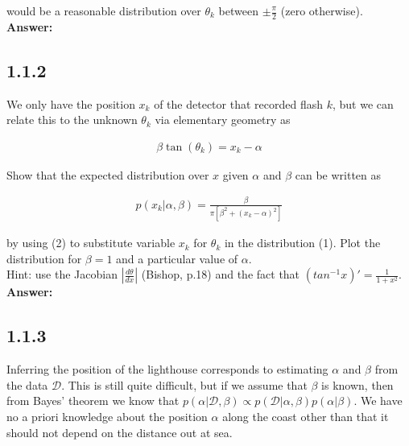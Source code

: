 \documentclass[a4paper]{article}
\begin{document}
would be a reasonable distribution over $\theta_k$ between $\pm \frac{\pi}{2}$ (zero otherwise).\\


\textbf{Answer:}\\



\subsection*{1.1.2}

We only have the position $x_k$ of the detector that recorded flash $k$, but we can relate this to the unknown $\theta_k$ via elementary geometry as

\begin{eqnarray}
\beta \tan(\theta_k) = x_k - \alpha	
\end{eqnarray}

Show that the expected distribution over $x$ given $\alpha$ and $\beta$ can be written as

\begin{eqnarray}
p(x_k | \alpha, \beta) = \frac{\beta}{\pi [\beta^2 + (x_k - \alpha)^2 ]}
\end{eqnarray}

by using (2) to substitute variable $x_k$ for $\theta_k$ in the distribution (1). Plot the distribution for $\beta = 1$ and a particular value of $\alpha$.\\
Hint: use the Jacobian $|\frac{d \theta}{d x }|$ (Bishop, p.18) and the fact that $(tan^{-1}x)' = \frac{1}{1 + x^2}$.\\



\textbf{Answer:}\\



\subsection*{1.1.3}

Inferring the position of the lighthouse corresponds to estimating $\alpha$ and $\beta$ from the data $\mathcal{D}$. This is still quite difficult, but if we assume that $\beta$ is known, then from Bayes’ theorem we know that $p(\alpha|\mathcal{D}, \beta) \propto p(\mathcal{D}|\alpha, \beta) p(\alpha|\beta)$. We have no a priori knowledge about the position $\alpha$ along the coast other than that it should not depend on the distance out at sea.\\
\end{document}
